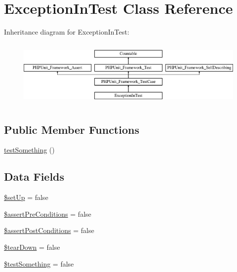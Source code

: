 \hypertarget{class_exception_in_test}{}\section{Exception\+In\+Test Class Reference}
\label{class_exception_in_test}
Inheritance diagram for Exception\+In\+Test\+:\begin{figure}[H]
\begin{center}
\leavevmode
\includegraphics[height=3.303835cm]{class_exception_in_test}
\end{center}
\end{figure}
\subsection*{Public Member Functions}
\begin{DoxyCompactItemize}
\item 
\mbox{\hyperlink{class_exception_in_test_a0fc4e17369bc9607ebdd850d9eda8167}{test\+Something}} ()
\end{DoxyCompactItemize}
\subsection*{Data Fields}
\begin{DoxyCompactItemize}
\item 
\mbox{\hyperlink{class_exception_in_test_aed7dec37f7cfd2a33216b3f81ebaeb8e}{\$set\+Up}} = false
\item 
\mbox{\hyperlink{class_exception_in_test_af1c82be5eeeef75035a066c7cc2eb172}{\$assert\+Pre\+Conditions}} = false
\item 
\mbox{\hyperlink{class_exception_in_test_ae16868ae0cb9f100fb80bf4987de5a85}{\$assert\+Post\+Conditions}} = false
\item 
\mbox{\hyperlink{class_exception_in_test_a9639b8e6f680299142ffe313f876712f}{\$tear\+Down}} = false
\item 
\mbox{\hyperlink{class_exception_in_test_a25acbdb5bf8dc30b31f537d60bfb02f5}{\$test\+Something}} = false
\end{DoxyCompactItemize}
